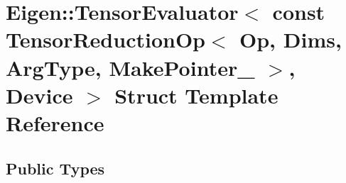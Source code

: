 \hypertarget{struct_eigen_1_1_tensor_evaluator_3_01const_01_tensor_reduction_op_3_01_op_00_01_dims_00_01_arg_4fdf2ec1445de4704eb590bc98040dc6}{}\section{Eigen\+:\+:Tensor\+Evaluator$<$ const Tensor\+Reduction\+Op$<$ Op, Dims, Arg\+Type, Make\+Pointer\+\_\+ $>$, Device $>$ Struct Template Reference}
\label{struct_eigen_1_1_tensor_evaluator_3_01const_01_tensor_reduction_op_3_01_op_00_01_dims_00_01_arg_4fdf2ec1445de4704eb590bc98040dc6}
\subsection*{Public Types}
